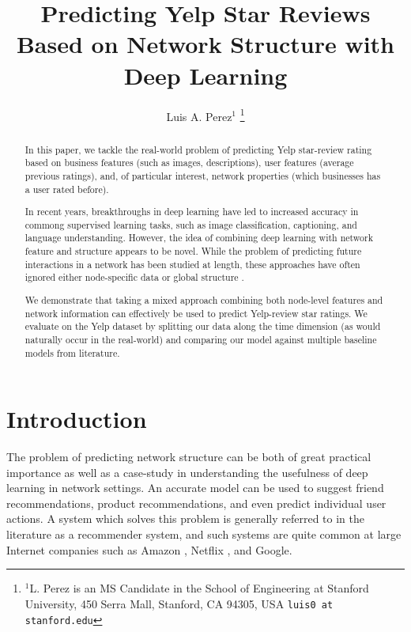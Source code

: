 \documentclass[letterpaper, 11 pt, conference]{ieeeconf}  %
\title{\LARGE \bf
Predicting Yelp Star Reviews Based on Network Structure with Deep Learning}
\author{Luis A. Perez$^{1}$%
\thanks{$^{1}$L. Perez is an MS Candidate in the School of Engineering at Stanford University,
        450 Serra Mall, Stanford, CA 94305, USA
        {\tt\small luis0 at stanford.edu}}%
}
\begin{document}
\maketitle
\thispagestyle{empty}
\pagestyle{empty}


\begin{abstract}

In this paper, we tackle the real-world problem of predicting Yelp star-review rating based on business features (such as images, descriptions), user features (average previous ratings), and, of particular interest, network properties (which businesses has a user rated before).

In recent years, breakthroughs in deep learning have led to increased accuracy in commong supervised learning tasks, such as image classification, captioning, and language understanding. However, the idea of combining deep learning with network feature and structure appears to be novel. While the problem of predicting future interactions in a network has been studied at length, these approaches have often ignored either node-specific data or global structure \cite{PintrestProject}.

We demonstrate that taking a mixed approach combining both node-level features and network information can effectively be used to predict Yelp-review star ratings. We evaluate on the Yelp dataset by splitting our data along the time dimension (as would naturally occur in the real-world) and comparing our model against multiple baseline models from literature.

\end{abstract}


\section{Introduction}
The problem of predicting network structure can be both of great practical importance as well as a case-study in understanding the usefulness of deep learning in network settings. An accurate model can be used to suggest friend recommendations, product recommendations, and even predict individual user actions. A system which solves this problem is generally referred to in the literature as a recommender system, and such systems are quite common at large Internet companies such as Amazon \cite{Linden:2003:ARI:642462.642471}, Netflix \cite{Zhou:2008:LPC:1424237.1424269}, and Google.
\end{document}
